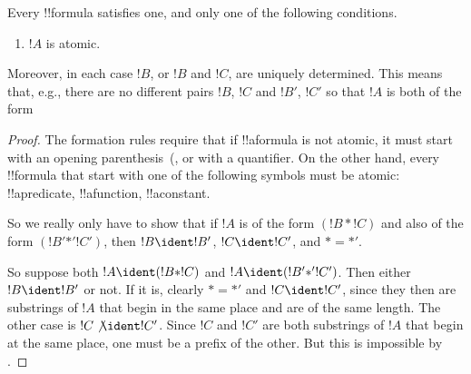 \documentclass[../../../include/open-logic-section]{subfiles}
\begin{document}
\begin{prop}
Every !!{formula} satisfies one, and only one of the following conditions.
\begin{enumerate}
\item $!A$ is atomic.







\end{enumerate}
Moreover, in each case $!B$, or $!B$ and $!C$, are uniquely
determined.  This means that, e.g., there are no different pairs $!B$,
$!C$ and $!B'$, $!C'$ so that $!A$ is both of the form 
\end{prop}

\begin{proof}
The formation rules require that if !!a{formula} is not atomic, it
must start with an opening parenthesis~(, 
or with a quantifier. On the other hand, every !!{formula} that start with
one of the following symbols must be atomic: !!a{predicate}, !!a{function}, !!a{constant}.

So we really only have to show that if $!A$ is of the form $(!B \ast
!C)$ and also of the form $(!B' \mathbin{\ast'} !C')$, then $!B \ident
!B'$, $!C \ident !C'$, and $\ast = {\ast'}$.

So suppose both $!A \ident (!B \ast !C)$ and $!A \ident (!B'
\mathbin{\ast'} !C')$.  Then either $!B \ident !B'$ or not.  If it is,
clearly $\ast = {\ast'}$ and $!C \ident !C'$, since they then are
substrings of $!A$ that begin in the same place and are of the same
length.  The other case is $!C \not\ident !C'$.  Since $!C$ and
$!C'$ are both substrings of $!A$ that begin at the same place, one
must be a prefix of the other.  But this is impossible by
.
\end{proof}
\end{document}
